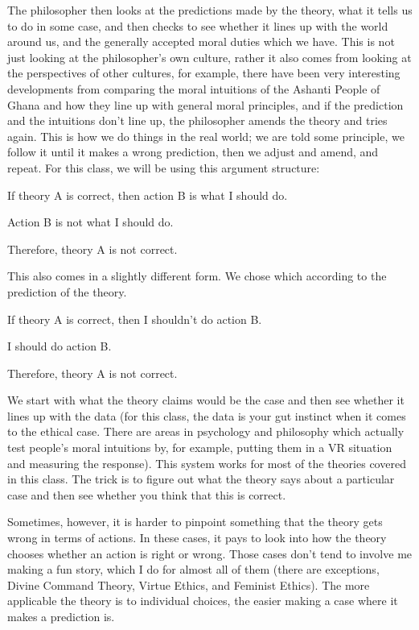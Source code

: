 The philosopher then looks at the predictions made by the theory, what it tells us to do in some case, and then checks to see whether it lines up with the world around us, and the generally accepted moral duties which we have. This is not just looking at the philosopher's own culture, rather it also comes from looking at the perspectives of other cultures, for example, there have been very interesting developments from comparing the moral intuitions of the Ashanti People of Ghana and how they line up with general moral principles, and if the prediction and the intuitions don't line up, the philosopher amends the theory and tries again. This is how we do things in the real world; we are told some principle, we follow it until it makes a wrong prediction, then we adjust and amend, and repeat. For this class, we will be using this argument structure:
\begin{earg}
    \item[]If theory A is correct, then action B is what I should do.
    \item[]Action B is not what I should do.
    \item[]Therefore, theory A is not correct.
\end{earg}
This also comes in a slightly different form. We chose which according to the prediction of the theory.
\begin{earg}
    \item[]If theory A is correct, then I shouldn't do action B.
    \item[]I should do action B.
    \item[]Therefore, theory A is not correct.
\end{earg}
We start with what the theory claims would be the case and then see whether it lines up with the data (for this class, the data is your gut instinct when it comes to the ethical case. There are areas in psychology and philosophy which actually test people's moral intuitions by, for example, putting them in a VR situation and measuring the response). This system works for most of the theories covered in this class. The trick is to figure out what the theory says about a particular case and then see whether you think that this is correct.

Sometimes, however, it is harder to pinpoint something that the theory gets wrong in terms of actions. In these cases, it pays to look into how the theory chooses whether an action is right or wrong. Those cases don’t tend to involve me making a fun story, which I do for almost all of them (there are exceptions, Divine Command Theory, Virtue Ethics, and Feminist Ethics). The more applicable the theory is to individual choices, the easier making a case where it makes a prediction is.

